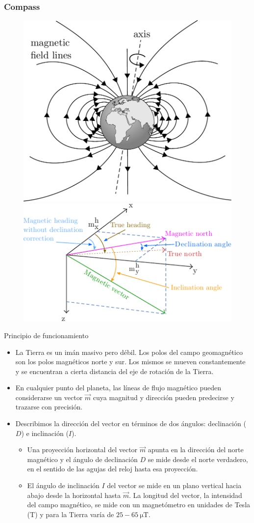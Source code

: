 \begin{frame}
    \frametitle{Compass}
    \begin{figure}[!h]
        \includegraphics[width=0.2\columnwidth]{images/earth_magnetic_field.pdf}
        \hspace{1cm}
        \includegraphics[width=0.3\columnwidth]{images/magnetic_field.pdf}
    \end{figure}
    \scriptsize
    \begin{block}{Principio de funcionamiento}
        \begin{itemize}
            
            \item La Tierra es un imán masivo pero débil. Los polos del campo geomagnético son los polos magnéticos norte y sur. Los mismos se mueven constantemente y se encuentran a cierta distancia del eje de rotación de la Tierra.
    
            \item En cualquier punto del planeta, las líneas de flujo magnético pueden considerarse un vector $\vec{m}$ cuya magnitud y dirección pueden predecirse y trazarse con precisión.
            
            \item Describimos la dirección del vector en términos de dos ángulos: declinación ($D$) e inclinación ($I$).
            
            \begin{itemize}
                \scriptsize
                \item Una proyección horizontal del vector $\vec{m}$ apunta en la dirección del norte magnético y el ángulo de declinación $D$ se mide desde el norte verdadero, en el sentido de las agujas del reloj hasta esa proyección.
            
                \item El ángulo de inclinación $I$ del vector se mide en un plano vertical hacia abajo desde la horizontal hasta $\vec{m}$. La longitud del vector, la intensidad del campo magnético, se mide con un magnetómetro en unidades de Tesla (T) y para la Tierra varía de $25-\SI{65}{\micro\tesla}$.
            \end{itemize}
        \end{itemize}
    \end{block}
\end{frame}


